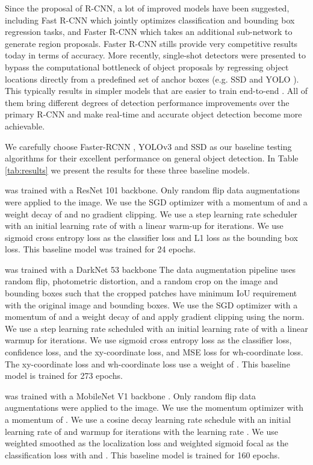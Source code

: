 \documentclass{article}
\begin{document}
Since the proposal of R-CNN, a lot of improved models have been suggested, including Fast R-CNN which jointly optimizes classification and bounding box regression tasks, and Faster R-CNN which takes an additional sub-network to generate region proposals. Faster R-CNN stills provide very competitive results today in terms of accuracy. More recently, single-shot detectors were presented to bypass the computational bottleneck of object proposals by regressing object locations directly from a predefined set of anchor boxes (e.g. SSD \cite{10.1007/978-3-319-46448-0_2} and YOLO \cite{redmon2018yolov3}). This typically results in simpler models that are easier to train end-to-end \cite{zhao2019object, kuznetsova2020}. All of them bring different degrees of detection performance improvements over the primary R-CNN and make real-time and accurate object detection become more achievable.

We carefully choose Faster-RCNN \cite{7485869}, YOLOv3 \cite{redmon2018yolov3} and SSD \cite{10.1007/978-3-319-46448-0_2} as our baseline testing algorithms for their excellent performance on general object detection. In Table \ref{tab:results} we present the results for these three baseline models.

\begin{description}[style=unboxed,leftmargin=0cm]
\item[Faster RCNN] was trained with a ResNet 101 backbone. Only random flip data augmentations  were applied to the image. We use the SGD optimizer with a momentum of  and a weight decay of  and no gradient clipping. We use a step learning rate scheduler with an initial learning rate of  with a linear warm-up for  iterations. We use sigmoid cross entropy loss as the classifier loss and L1 loss as the bounding box loss. This baseline model was trained for 24 epochs.
\item[YOLO] was trained with a DarkNet 53 backbone The data augmentation pipeline uses random flip, photometric distortion, and a random crop on the image and bounding boxes such that the cropped patches have minimum IoU requirement with the original image and bounding boxes. We use the SGD optimizer with a momentum of  and a weight decay of  and apply gradient clipping using the  norm. We use a step learning rate scheduled with an initial learning rate of  with a linear warmup for  iterations. We use sigmoid cross entropy loss as the classifier loss, confidence loss, and the xy-coordinate loss, and MSE loss for wh-coordinate loss. The xy-coordinate loss and wh-coordinate loss use a weight of . This baseline model is trained for 273 epochs.
\item[SSD] was trained with a MobileNet V1 backbone . Only random flip data augmentations  were applied to the image. We use the momentum optimizer with a momentum of . We use a cosine decay learning rate schedule with an initial learning rate of  and warmup for  iterations with the learning rate . We use weighted smoothed  as the localization loss and weighted sigmoid focal as the classification loss with  and . This baseline model is trained for 160 epochs.
\end{description}
\end{document}
